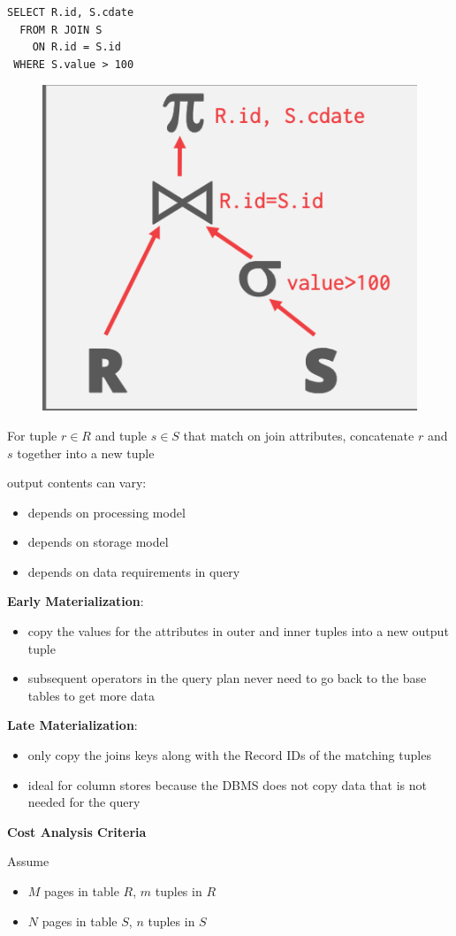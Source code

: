 \documentclass[11pt]{article}
\begin{document}
\begin{verbatim}
SELECT R.id, S.cdate
  FROM R JOIN S
    ON R.id = S.id
 WHERE S.value > 100
\end{verbatim}

\begin{figure}[htbp]
\centering
\includegraphics[width=.3\textwidth]{../images/15445/23.png}
\label{}
\end{figure}

For tuple \(r\in R\) and tuple \(s\in S\) that match on join attributes, concatenate \(r\) and \(s\)
together into a new tuple

output contents can vary:
\begin{itemize}
\item depends on processing model
\item depends on storage model
\item depends on data requirements in query
\end{itemize}

\textbf{Early Materialization}:
\begin{itemize}
\item copy the values for the attributes in outer and inner tuples into a new output tuple
\item subsequent operators in the query plan never need to go back to the base tables to get more
data
\end{itemize}

\textbf{Late Materialization}:
\begin{itemize}
\item only copy the joins keys along with the Record IDs of the matching tuples
\item ideal for column stores because the DBMS does not copy data that is not needed for the query
\end{itemize}

\textbf{Cost Analysis Criteria}

Assume
\begin{itemize}
\item \(M\) pages in table \(R\), \(m\) tuples in \(R\)
\item \(N\) pages in table \(S\), \(n\) tuples in \(S\)
\end{itemize}
\end{document}
